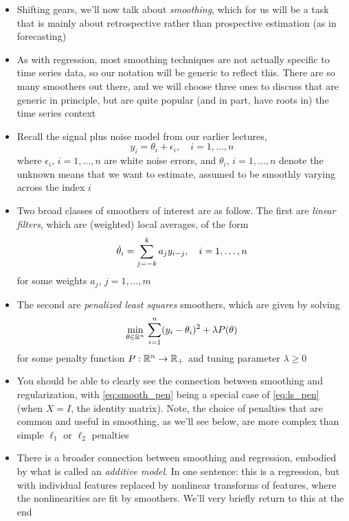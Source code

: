 \documentclass{article}
\begin{document}
\begin{itemize}
\item Shifting gears, we'll now talk about \emph{smoothing}, which for us will
  be a task that is mainly about retrospective rather than prospective
  estimation (as in forecasting)

\item As with regression, most smoothing techniques are not actually specific to
  time series data, so our notation will be generic to reflect this. There are
  so many smoothers out there, and we will choose three ones to discuss that are
  generic in principle, but are quite popular (and in part, have roots in) the
  time series context  

\item Recall the signal plus noise model from our earlier lectures, 
  \[
  y_i = \theta_i + \epsilon_i, \quad i = 1,\dots,n
  \]
  where $\epsilon_i$, $i=1,\dots,n$ are white noise errors, and $\theta_i$, $i =
  1,\dots,n$ denote the unknown means that we want to estimate, assumed to be
  smoothly varying across the index $i$

\item Two broad classes of smoothers of interest are as follow. The first are
  \emph{linear filters}, which are (weighted) local averages, of the form  
  \begin{equation}
  \label{eq:smooth_lin}
  \hat{\theta}_i = \sum_{j=-k}^k a_j y_{i-j},\quad i = 1,\dots,n
  \end{equation}
  for some weights $a_j$, $j = 1,\dots,m$

\item The second are \emph{penalized least squares} smoothers, which are given
  by solving    
  \begin{equation}
  \label{eq:smooth_pen}
  \min_{\theta \in \mathbb{R}^n} \, \sum_{i=1}^n (y_i - \theta_i)^2 + \lambda P(\theta) 
  \end{equation}
  for some penalty function $P : \mathbb{R}^n \to \mathbb{R}_+$ and tuning parameter $\lambda 
  \geq 0$   

\item You should be able to clearly see the connection between smoothing and
  regularization, with \eqref{eq:smooth_pen} being a special case of
  \eqref{eq:ls_pen} (when $X = I$, the identity matrix). Note, the choice of
  penalties that are common and useful in smoothing, as we'll see below, are
  more complex than simple $\ell_1$ or $\ell_2$ penalties  

\item There is a broader connection between smoothing and regression, embodied
  by what is called an \emph{additive model}. In one sentence: this is a
  regression, but with individual features replaced by nonlinear transforms of
  features, where the nonlinearities are fit by smoothers. We'll very briefly
  return to this at the end
\end{itemize}
\end{document}
